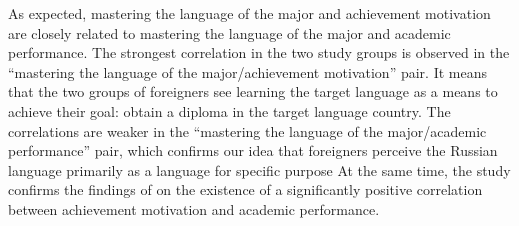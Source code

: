 \documentclass[english]{textolivre}
\begin{document}
\begin{table}[htbp]
\begin{threeparttable}
\end{threeparttable}
\end{table}

As expected, mastering the language of the major and achievement motivation are closely related to mastering the language of the major and academic performance. The strongest correlation in the two study groups is observed in the “mastering the language of the major/achievement motivation” pair. It means that the two groups of foreigners see learning the target language as a means to achieve their goal: obtain a diploma in the target language country. The correlations are weaker in the “mastering the language of the major/academic performance” pair, which confirms our idea that foreigners perceive the Russian language primarily as a language for specific purpose At the same time, the study confirms the findings of \textcite{yazdani_studying_2014} on the existence of a significantly positive correlation between achievement motivation and academic performance.
\end{document}
